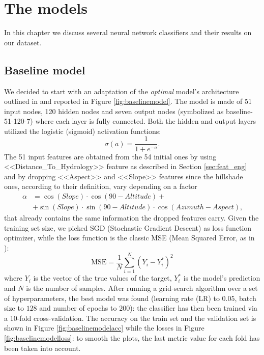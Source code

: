 \chapter{The models}
In this chapter we discuss several neural network classifiers and their results on our dataset.
\section{Baseline model}
\label{sec:baselinemodel}
We decided to start with an adaptation of the \textit{optimal} model's architecture outlined in \cite{blackardDean} and reported in Figure \ref{fig:baselinemodel}. The model is made of 51 input nodes, 120 hidden nodes and seven output nodes (symbolized as baseline-51-120-7) where each layer is fully connected. Both the hidden and output layers utilized the logistic (sigmoid) activation functions:
$$
\sigma(a) = \frac{1}{1 + e^{-a}}\text{.}
$$
The 51 input features are obtained from the 54 initial ones by using <<Distance\_To\_Hydrology>> feature as described in Section \ref{sec:feat_eng} and by dropping <<Aspect>> and <<Slope>> features since the hillshade ones, according to their definition, vary depending on a factor
\begin{equation}
\begin{aligned}
\alpha&=\cos(Slope)\cdot \cos(90-Altitude)+ \\
& +\sin(Slope) \cdot \sin(90-Altitude)\cdot \cos(Azimuth-Aspect)\text{,}
\end{aligned}
\end{equation}
that already contains the same information the dropped features carry. Given the training set size, we picked SGD (Stochastic Gradient Descent) as loss function optimizer, while the loss function is the classic MSE (Mean Squared Error, as in \cite{blackardDean}):
\begin{equation}
\text{MSE} = \frac{1}{N}\sum_{i=1}^{N}(Y_i - Y^{*}_{i})^2
\end{equation}
where $Y_i$ is the vector of the true values of the target, $Y^{*}_{i}$ is the model's prediction and $N$ is the number of samples. After running a grid-search algorithm over a set of hyperparameters, the best model was found (learning rate (LR) to $0.05$, batch size to $128$ and number of epochs to $200$): the classifier has then been trained via a 10-fold cross-validation. The accuracy on the train set and the validation set is shown in Figure \ref{fig:baselinemodelacc} while the losses in Figure \ref{fig:baselinemodelloss}: to smooth the plots, the last metric value for each fold has been taken into account.
